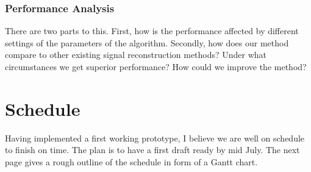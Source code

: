 \documentclass[final,3p]{report}
\begin{document}
\subsubsection{Performance Analysis}
There are two parts to this. First, how is the performance affected by different settings of the parameters of the algorithm.
Secondly, how does our method compare to other existing signal reconstruction methods? Under what circumstances we get superior performance? How could we improve the method?

\section{Schedule}
Having implemented a first working prototype, I believe we are well on schedule to finish on time.
The plan is to have a first draft ready by mid July.
The next page gives a rough outline of the schedule in form of a Gantt chart.






%







\end{document}
